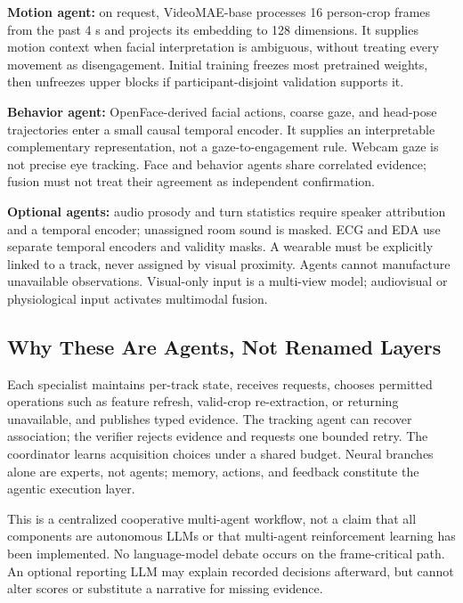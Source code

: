 \documentclass[a4paper,conference]{IEEEtran}
\begin{document}
\textbf{Motion agent:} on request, VideoMAE-base processes 16 person-crop frames from the past 4 s and projects its embedding to 128 dimensions. It supplies motion context when facial interpretation is ambiguous, without treating every movement as disengagement. Initial training freezes most pretrained weights, then unfreezes upper blocks if participant-disjoint validation supports it.

\textbf{Behavior agent:} OpenFace-derived facial actions, coarse gaze, and head-pose trajectories \cite{openface} enter a small causal temporal encoder. It supplies an interpretable complementary representation, not a gaze-to-engagement rule. Webcam gaze is not precise eye tracking. Face and behavior agents share correlated evidence; fusion must not treat their agreement as independent confirmation.

\textbf{Optional agents:} audio prosody and turn statistics require speaker attribution and a temporal encoder; unassigned room sound is masked. ECG and EDA use separate temporal encoders and validity masks. A wearable must be explicitly linked to a track, never assigned by visual proximity. Agents cannot manufacture unavailable observations. Visual-only input is a multi-view model; audiovisual or physiological input activates multimodal fusion.

\subsection{Why These Are Agents, Not Renamed Layers}
Each specialist maintains per-track state, receives requests, chooses permitted operations such as feature refresh, valid-crop re-extraction, or returning unavailable, and publishes typed evidence. The tracking agent can recover association; the verifier rejects evidence and requests one bounded retry. The coordinator learns acquisition choices under a shared budget. Neural branches alone are experts, not agents; memory, actions, and feedback constitute the agentic execution layer.

This is a centralized cooperative multi-agent workflow, not a claim that all components are autonomous LLMs or that multi-agent reinforcement learning has been implemented. No language-model debate occurs on the frame-critical path. An optional reporting LLM may explain recorded decisions afterward, but cannot alter scores or substitute a narrative for missing evidence.
\end{document}
